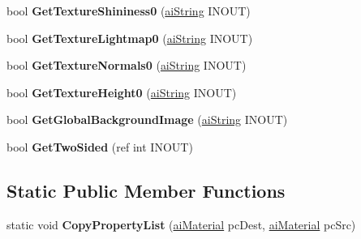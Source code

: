 \begin{DoxyCompactItemize}
\item 
\hypertarget{classai_material_a379b9e544eef14aef37cba0996a04618}{bool {\bfseries Get\+Texture\+Shininess0} (\hyperlink{structai_string}{ai\+String} I\+N\+O\+U\+T)}\label{classai_material_a379b9e544eef14aef37cba0996a04618}

\item 
\hypertarget{classai_material_aaa6eb79c3308d907ee299d7cd919ae16}{bool {\bfseries Get\+Texture\+Lightmap0} (\hyperlink{structai_string}{ai\+String} I\+N\+O\+U\+T)}\label{classai_material_aaa6eb79c3308d907ee299d7cd919ae16}

\item 
\hypertarget{classai_material_ac0052420c5d1b279ef0c07ec3ab756c2}{bool {\bfseries Get\+Texture\+Normals0} (\hyperlink{structai_string}{ai\+String} I\+N\+O\+U\+T)}\label{classai_material_ac0052420c5d1b279ef0c07ec3ab756c2}

\item 
\hypertarget{classai_material_a5c6be905323c20b00b4a40748398d6f4}{bool {\bfseries Get\+Texture\+Height0} (\hyperlink{structai_string}{ai\+String} I\+N\+O\+U\+T)}\label{classai_material_a5c6be905323c20b00b4a40748398d6f4}

\item 
\hypertarget{classai_material_a9391832b023aba8860b14a71d0f2ff96}{bool {\bfseries Get\+Global\+Background\+Image} (\hyperlink{structai_string}{ai\+String} I\+N\+O\+U\+T)}\label{classai_material_a9391832b023aba8860b14a71d0f2ff96}

\item 
\hypertarget{classai_material_a8d1b4481514cf28dedc7cd50222a00aa}{bool {\bfseries Get\+Two\+Sided} (ref int I\+N\+O\+U\+T)}\label{classai_material_a8d1b4481514cf28dedc7cd50222a00aa}

\end{DoxyCompactItemize}
\subsection*{Static Public Member Functions}
\begin{DoxyCompactItemize}
\item 
\hypertarget{classai_material_a3ce67a2583c345797de2931be2dd0b60}{static void {\bfseries Copy\+Property\+List} (\hyperlink{classai_material}{ai\+Material} pc\+Dest, \hyperlink{classai_material}{ai\+Material} pc\+Src)}\label{classai_material_a3ce67a2583c345797de2931be2dd0b60}

\end{DoxyCompactItemize}
